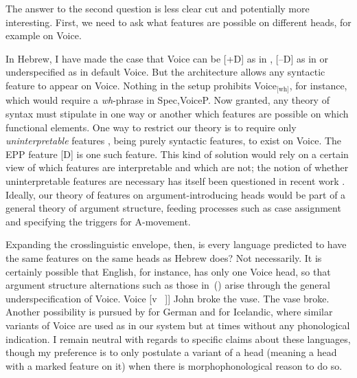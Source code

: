 The answer to the second question is less clear cut and potentially more interesting. First, we need to ask what features are possible on different heads, for example on Voice.

In Hebrew, I have made the case that Voice can be [+D] as in \vd, [--D] as in {\vz} or underspecified as in default Voice. But the architecture allows any syntactic feature to appear on Voice. Nothing in the setup prohibits Voice$_{\text{[wh]}}$, for instance, which would require a \emph{wh}-phrase in Spec,VoiceP. Now granted, any theory of syntax must stipulate in one way or another which features are possible on which functional elements. One way to restrict our theory is to require only \emph{uninterpretable} features \citep{chomsky95}, being purely syntactic features, to exist on Voice. The EPP feature [D] is one such feature. This kind of solution would rely on a certain view of which features are interpretable and which are not; the notion of whether uninterpretable features are necessary has itself been questioned in recent work \citep{preminger14mit}. Ideally, our theory of features on argument-introducing heads would be part of a general theory of argument structure, feeding processes such as case assignment and specifying the triggers for A-movement.

Expanding the crosslinguistic envelope, then, is every language predicted to have the same features on the same heads as Hebrew does? Not necessarily. It is certainly possible that English, for instance, has only one Voice head, so that argument structure alternations such as those in~(\nextx) arise through the general underspecification of Voice. \pex {[}Voice [v ~\!]]
	\a John broke the vase.
	\a The vase broke.
\xe
Another possibility is pursued by \cite{schaefer08} for German and \cite{wood15springer} for Icelandic, where similar variants of Voice are used as in our system but at times without any phonological indication. I remain neutral with regards to specific claims about these languages, though my preference is to only postulate a variant of a head (meaning a head with a marked feature on it) when there is morphophonological reason to do so.

